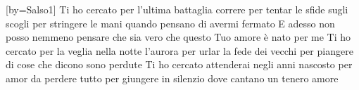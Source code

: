 [by={Salso1}]
\beginverse
Ti ho cercato
per l'ultima battaglia
correre
per tentar le sfide sugli scogli
per stringere le mani quando pensano
di avermi fermato
\endverse
\beginchorus
E adesso non posso nemmeno pensare
che sia vero che questo Tuo amore
è nato per me
\endchorus
\beginverse
Ti ho cercato
per la veglia nella notte
l'aurora
per urlar la fede dei vecchi
per piangere di cose che dicono
sono perdute
\endverse \beginverse
Ti ho cercato
attenderai negli anni
nascosto
per amor da perdere tutto
per giungere in silenzio dove cantano
un tenero amore
\endverse
\endsong
